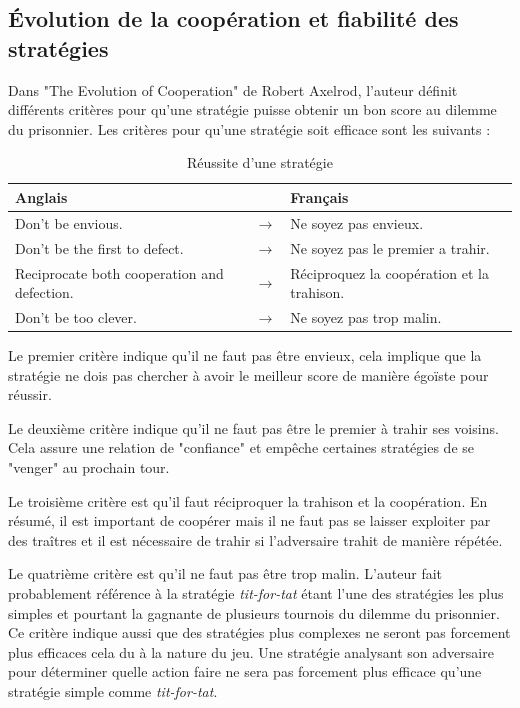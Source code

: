 \documentclass[a4paper, french]{article}
\begin{document}
\pagebreak
\subsection{Évolution de la coopération et fiabilité des stratégies}
Dans "The Evolution of Cooperation" de Robert Axelrod\cite{book}, l'auteur définit différents critères pour qu'une stratégie puisse obtenir un bon score au dilemme du prisonnier. Les critères pour qu'une stratégie soit efficace sont les suivants :

\begin{table}[htp]
\centering
\begin{tabular}{lll}
\hline
\textbf{Anglais}                            & \textbf{}     & \textbf{Français}                          \\ \hline
Don't be envious.                           & $\rightarrow$ & Ne soyez pas envieux.                      \\
Don't be the first to defect.               & $\rightarrow$ & Ne soyez pas le premier a trahir.          \\
Reciprocate both cooperation and defection. & $\rightarrow$ & Réciproquez la coopération et la trahison. \\
Don't be too clever.                        & $\rightarrow$ & Ne soyez pas trop malin.                   \\ \hline
\end{tabular}
\caption{Réussite d'une stratégie}
\end{table}

Le premier critère indique qu'il ne faut pas être envieux, cela implique que la stratégie ne dois pas chercher à avoir le meilleur score de manière égoïste pour réussir.

Le deuxième critère indique qu'il ne faut pas être le premier à trahir ses voisins. Cela assure une relation de "confiance" et empêche certaines stratégies de se "venger" au prochain tour. 

Le troisième critère est qu'il faut réciproquer la trahison et la coopération. En résumé, il est important de coopérer mais il ne faut pas se laisser exploiter par des traîtres et il est nécessaire de trahir si l'adversaire trahit de manière répétée.

Le quatrième critère est qu'il ne faut pas être trop malin. L'auteur fait probablement référence à la stratégie \textit{tit-for-tat} étant l'une des stratégies les plus simples et pourtant la gagnante de plusieurs tournois du dilemme du prisonnier. Ce critère indique aussi que des stratégies plus complexes ne seront pas forcement plus efficaces cela du à la nature du jeu. Une stratégie analysant son adversaire pour déterminer quelle action faire ne sera pas forcement plus efficace qu'une stratégie simple comme \textit{tit-for-tat}.
\end{document}
